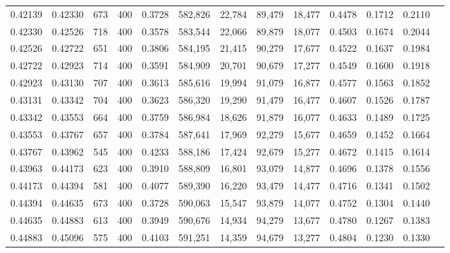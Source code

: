 \begin{tabular}{rrrrrrrrrrrrr}
0.42139 & 0.42330 &    673 & 400 &                                     0.3728 & 582,826 &  22,784 &  89,479 &  18,477 & 0.4478 & 0.1712 & 0.2110 \\
0.42330 & 0.42526 &    718 & 400 &                                     0.3578 & 583,544 &  22,066 &  89,879 &  18,077 & 0.4503 & 0.1674 & 0.2044 \\
0.42526 & 0.42722 &    651 & 400 &                                     0.3806 & 584,195 &  21,415 &  90,279 &  17,677 & 0.4522 & 0.1637 & 0.1984 \\
0.42722 & 0.42923 &    714 & 400 &                                     0.3591 & 584,909 &  20,701 &  90,679 &  17,277 & 0.4549 & 0.1600 & 0.1918 \\
0.42923 & 0.43130 &    707 & 400 &                                     0.3613 & 585,616 &  19,994 &  91,079 &  16,877 & 0.4577 & 0.1563 & 0.1852 \\
0.43131 & 0.43342 &    704 & 400 &                                     0.3623 & 586,320 &  19,290 &  91,479 &  16,477 & 0.4607 & 0.1526 & 0.1787 \\
0.43342 & 0.43553 &    664 & 400 &                                     0.3759 & 586,984 &  18,626 &  91,879 &  16,077 & 0.4633 & 0.1489 & 0.1725 \\
0.43553 & 0.43767 &    657 & 400 &                                     0.3784 & 587,641 &  17,969 &  92,279 &  15,677 & 0.4659 & 0.1452 & 0.1664 \\
0.43767 & 0.43962 &    545 & 400 &                                     0.4233 & 588,186 &  17,424 &  92,679 &  15,277 & 0.4672 & 0.1415 & 0.1614 \\
0.43963 & 0.44173 &    623 & 400 &                                     0.3910 & 588,809 &  16,801 &  93,079 &  14,877 & 0.4696 & 0.1378 & 0.1556 \\
0.44173 & 0.44394 &    581 & 400 &                                     0.4077 & 589,390 &  16,220 &  93,479 &  14,477 & 0.4716 & 0.1341 & 0.1502 \\
0.44394 & 0.44635 &    673 & 400 &                                     0.3728 & 590,063 &  15,547 &  93,879 &  14,077 & 0.4752 & 0.1304 & 0.1440 \\
0.44635 & 0.44883 &    613 & 400 &                                     0.3949 & 590,676 &  14,934 &  94,279 &  13,677 & 0.4780 & 0.1267 & 0.1383 \\
0.44883 & 0.45096 &    575 & 400 &                                     0.4103 & 591,251 &  14,359 &  94,679 &  13,277 & 0.4804 & 0.1230 & 0.1330 \\

\end{tabular}
